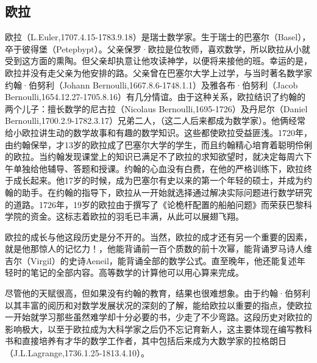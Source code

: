 \documentclass[UTF8]{ctexart}
\begin{document}
\subsection{欧拉}

欧拉（L.Euler,1707.4.15-1783.9.18）是瑞士数学家。生于瑞士的巴塞尔（Basel），卒于彼得堡（Petepbypt）。父亲保罗·欧拉是位牧师，喜欢数学，所以欧拉从小就受到这方面的熏陶。但父亲却执意让他攻读神学，以便将来接他的班。幸运的是，欧拉并没有走父亲为他安排的路。父亲曾在巴塞尔大学上过学，与当时著名数学家约翰·伯努利（Johann Bernoulli,1667.8.6-1748.1.1）及雅各布·伯努利（Jacob Bernoulli,1654.12.27-1705.8.16）有几分情谊。由于这种关系，欧拉结识了约翰的两个儿子：擅长数学的尼古拉（Nicolaus Bernoulli,1695-1726）及丹尼尔（Daniel Bernoulli,1700.2.9-1782.3.17）兄弟二人，（这二人后来都成为数学家）。他俩经常给小欧拉讲生动的数学故事和有趣的数学知识。这些都使欧拉受益匪浅。1720年，由约翰保举，才13岁的欧拉成了巴塞尔大学的学生，而且约翰精心培育着聪明伶俐的欧拉。当约翰发现课堂上的知识已满足不了欧拉的求知欲望时，就决定每周六下午单独给他辅导、答题和授课。约翰的心血没有白费，在他的严格训练下，欧拉终于成长起来。他17岁的时候，成为巴塞尔有史以来的第一个年轻的硕士，并成为约翰的助手。在约翰的指导下，欧拉从一开始就选择通过解决实际问题进行数学研究的道路。1726年，19岁的欧拉由于撰写了《论桅杆配置的船舶问题》而荣获巴黎科学院的资金。这标志着欧拉的羽毛已丰满，从此可以展翅飞翔。

欧拉的成长与他这段历史是分不开的。当然，欧拉的成才还有另一个重要的因素，就是他那惊人的记忆力！，他能背诵前一百个质数的前十次幂，能背诵罗马诗人维吉尔（Virgil）的史诗Aeneil，能背诵全部的数学公式。直至晚年，他还能复述年轻时的笔记的全部内容。高等数学的计算他可以用心算来完成。

尽管他的天赋很高，但如果没有约翰的教育，结果也很难想象。由于约翰·伯努利以其丰富的阅历和对数学发展状况的深刻的了解，能给欧拉以重要的指点，使欧拉一开始就学习那些虽然难学却十分必要的书，少走了不少弯路。这段历史对欧拉的影响极大，以至于欧拉成为大科学家之后仍不忘记育新人，这主要体现在编写教科书和直接培养有才华的数学工作者，其中包括后来成为大数学家的拉格朗日（J.L.Lagrange,1736.1.25-1813.4.10）。
\end{document}
